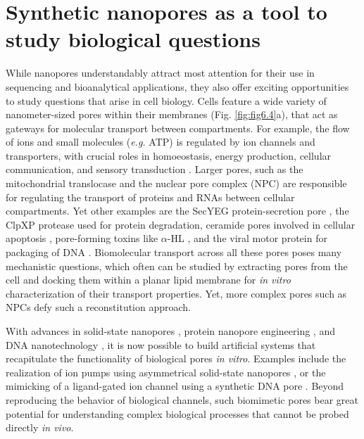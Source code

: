\section{Synthetic nanopores as a tool to study biological questions}
While nanopores understandably attract most attention for their use in sequencing and bioanalytical applications, they also offer exciting opportunities to study questions that arise in cell biology. Cells feature a wide variety of nanometer-sized pores within their membranes (Fig. \ref{fig:fig6.4}a), that act as gateways for molecular transport between compartments. For example, the flow of ions and small molecules (\emph{e.g.} ATP) is regulated by ion channels and transporters, with crucial roles in homoeostasis, energy production, cellular communication, and sensory transduction \cite{DalePurvesGeorgeJ.AugustineDavidFitzpatrickLawrenceC.KatzAnthony-SamuelLaMantiaJamesO.McNamara2001}. Larger pores, such as the mitochondrial translocase \cite{Dekker1998} and the nuclear pore complex (NPC) \cite{Kim2018} are responsible for regulating the transport of proteins and RNAs between cellular compartments. Yet other examples are the SecYEG protein-secretion pore \cite{DriessenArnoldJ.M.andNouwen2008}, the ClpXP protease \cite{Baker2012} used for protein degradation, ceramide pores involved in cellular apoptosis \cite{Delcour2015}, pore-forming toxins like $\alpha$-HL \cite{Sugawara2015}, and the viral motor protein for packaging of DNA \cite{Wang2017}. Biomolecular transport across all these pores poses many mechanistic questions, which often can be studied by extracting pores from the cell and docking them within a planar lipid membrane for \emph{in vitro} characterization of their transport properties. Yet, more complex pores such as NPCs defy such a reconstitution approach. 


With advances in solid-state nanopores \cite{Xue2020}, protein nanopore engineering \cite{Wang2018}, and DNA nanotechnology \cite{Ramezani2020}, it is now possible to build artificial systems that recapitulate the functionality of biological pores \emph{in vitro}. Examples include the realization of ion pumps using asymmetrical solid-state nanopores \cite{Siwy2002}, or the mimicking of a ligand-gated ion channel using a synthetic DNA pore \cite{Burns2016b}. Beyond reproducing the behavior of biological channels, such biomimetic pores bear great potential for understanding complex biological processes that cannot be probed directly \emph{in vivo}. 


